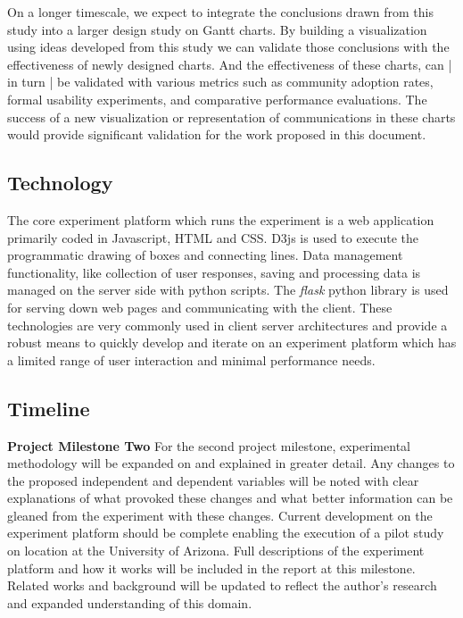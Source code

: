 On a longer timescale, we expect to integrate the conclusions drawn from this study into a larger design study on Gantt charts. By building a visualization using ideas developed from this study we can validate those conclusions with the effectiveness of newly designed charts. And the effectiveness of these charts, can | in turn | be validated with various metrics such as community adoption rates, formal usability experiments, and comparative performance evaluations. The success of a new visualization or representation of communications in these charts would provide significant validation for the work proposed in this document.


\subsection{Technology}
\label{sec:tech}

The core experiment platform which runs the experiment is a web application primarily coded in Javascript, HTML and CSS. D3js is used to execute the programmatic drawing of boxes and connecting lines. Data management functionality, like collection of user responses, saving and processing data is managed on the server side with python scripts. The \textit{flask} python library is used for serving down web pages and communicating with the client. These technologies are very commonly used in client server architectures and provide a robust means to quickly develop and iterate on an experiment platform which has a limited range of user interaction and minimal performance needs.

\subsection{Timeline}
\label{sec:timeline}

\vspace{1.5ex}\noindent\textbf{Project Milestone Two} 
For the second project milestone, experimental methodology will be expanded on and explained in greater detail. Any changes to the proposed independent and dependent variables will be noted with clear explanations of what provoked these changes and what better information can be gleaned from the experiment with these changes. Current development on the experiment platform should be complete enabling the execution of a pilot study on location at the University of Arizona. Full descriptions of the experiment platform and how it works will be included in the report at this milestone. Related works and background will be updated to reflect the author's research and expanded understanding of this domain.

